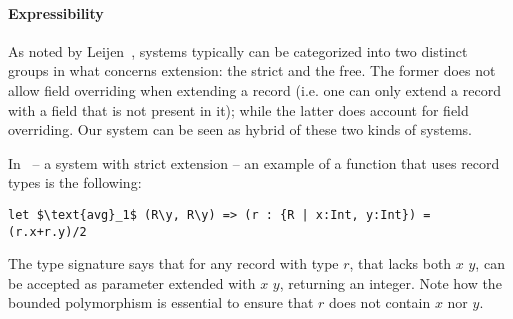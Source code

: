 \begin{comment}
\begin{lstlisting}[mathescape=true]
let $\text{addL}_3$ (A * { l : $\bot$ }) (x : A) : A & { l : $\bot$ } = $\ldots$ in $\ldots$ 
\end{lstlisting}
Unfortunately, our system does not support the $\bot$ type, so this program would not be accepted.
We will get into the reasons for this in further detail, in Section~\ref{sec:conclusion}.
\end{comment}


\paragraph{Expressibility}
As noted by Leijen~\cite{leijen2005extensible}, systems typically can be
categorized into two distinct groups in what concerns extension: the
strict and the free.  The former does not allow field overriding when
extending a record (i.e. one can only extend a record with a field
that is not present in it); while the latter does account for field
overriding.  Our system can be seen as hybrid of these two kinds of
systems.  

In~\cite{jones99lightweight} -- a system with strict extension -- an example of a function that uses 
record types is the following:
\begin{lstlisting}[mathescape=true]
let $\text{avg}_1$ (R\y, R\y) => (r : {R | x:Int, y:Int}) = (r.x+r.y)/2
\end{lstlisting}
The type signature says that for any record with type $r$, that lacks both $x$ $y$, can be accepted
as parameter extended with $x$ $y$, returning an integer.
Note how the bounded polymorphism is essential to ensure that $r$ does not contain $x$ nor $y$.

